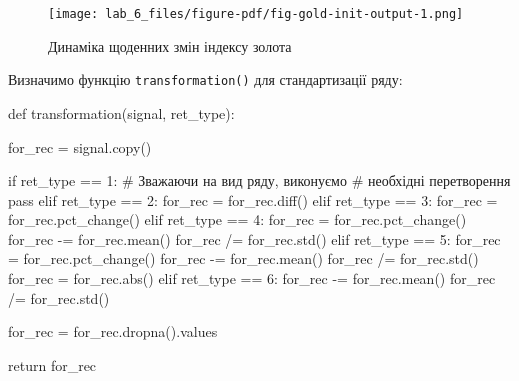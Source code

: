 \documentclass[
  letterpaper,
]{report}
\newenvironment{Shaded}{\begin{snugshade}}{\end{snugshade}}
\newcommand{\BuiltInTok}[1]{\textcolor[rgb]{0.00,0.23,0.31}{#1}}
\newcommand{\CommentTok}[1]{\textcolor[rgb]{0.37,0.37,0.37}{#1}}
\newcommand{\ControlFlowTok}[1]{\textcolor[rgb]{0.00,0.23,0.31}{#1}}
\newcommand{\DecValTok}[1]{\textcolor[rgb]{0.68,0.00,0.00}{#1}}
\newcommand{\KeywordTok}[1]{\textcolor[rgb]{0.00,0.23,0.31}{#1}}
\newcommand{\NormalTok}[1]{\textcolor[rgb]{0.00,0.23,0.31}{#1}}
\newcommand{\OperatorTok}[1]{\textcolor[rgb]{0.37,0.37,0.37}{#1}}
\begin{document}
\begin{figure}[H]

{\centering \texttt{[image: lab\_6\_files/figure-pdf/fig-gold-init-output-1.png]}

}

\caption{\label{fig-gold-init}Динаміка щоденних змін індексу золота}

\end{figure}

Визначимо функцію \texttt{transformation()} для стандартизації ряду:

\begin{Shaded}
\begin{Highlighting}[]
\KeywordTok{def}\NormalTok{ transformation(signal, ret\_type):}

\NormalTok{    for\_rec }\OperatorTok{=}\NormalTok{ signal.copy()}

    \ControlFlowTok{if}\NormalTok{ ret\_type }\OperatorTok{==} \DecValTok{1}\NormalTok{:       }\CommentTok{\# Зважаючи на вид ряду, виконуємо}
                            \CommentTok{\# необхідні перетворення}
        \ControlFlowTok{pass}
    \ControlFlowTok{elif}\NormalTok{ ret\_type }\OperatorTok{==} \DecValTok{2}\NormalTok{:}
\NormalTok{        for\_rec }\OperatorTok{=}\NormalTok{ for\_rec.diff()}
    \ControlFlowTok{elif}\NormalTok{ ret\_type }\OperatorTok{==} \DecValTok{3}\NormalTok{:}
\NormalTok{        for\_rec }\OperatorTok{=}\NormalTok{ for\_rec.pct\_change()}
    \ControlFlowTok{elif}\NormalTok{ ret\_type }\OperatorTok{==} \DecValTok{4}\NormalTok{:}
\NormalTok{        for\_rec }\OperatorTok{=}\NormalTok{ for\_rec.pct\_change()}
\NormalTok{        for\_rec }\OperatorTok{{-}=}\NormalTok{ for\_rec.mean()}
\NormalTok{        for\_rec }\OperatorTok{/=}\NormalTok{ for\_rec.std()}
    \ControlFlowTok{elif}\NormalTok{ ret\_type }\OperatorTok{==} \DecValTok{5}\NormalTok{: }
\NormalTok{        for\_rec }\OperatorTok{=}\NormalTok{ for\_rec.pct\_change()}
\NormalTok{        for\_rec }\OperatorTok{{-}=}\NormalTok{ for\_rec.mean()}
\NormalTok{        for\_rec }\OperatorTok{/=}\NormalTok{ for\_rec.std()}
\NormalTok{        for\_rec }\OperatorTok{=}\NormalTok{ for\_rec.}\BuiltInTok{abs}\NormalTok{()}
    \ControlFlowTok{elif}\NormalTok{ ret\_type }\OperatorTok{==} \DecValTok{6}\NormalTok{:}
\NormalTok{        for\_rec }\OperatorTok{{-}=}\NormalTok{ for\_rec.mean()}
\NormalTok{        for\_rec }\OperatorTok{/=}\NormalTok{ for\_rec.std()}

\NormalTok{    for\_rec }\OperatorTok{=}\NormalTok{ for\_rec.dropna().values}

    \ControlFlowTok{return}\NormalTok{ for\_rec}
\end{Highlighting}
\end{Shaded}
\end{document}
